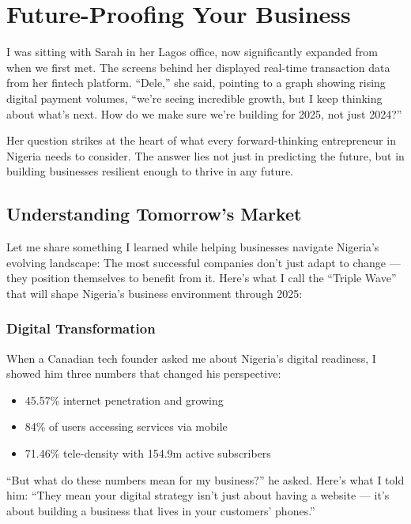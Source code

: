 \chapter{Future-Proofing Your Business}\label{ch:future-proofing-your-business}

I was sitting with Sarah in her Lagos office, now significantly expanded from when we first met. The screens behind her displayed real-time transaction data from her fintech platform. ``Dele,'' she said, pointing to a graph showing rising digital payment volumes, ``we're seeing incredible growth, but I keep thinking about what's next. How do we make sure we're building for 2025, not just 2024?''

Her question strikes at the heart of what every forward-thinking entrepreneur in Nigeria needs to consider. The answer lies not just in predicting the future, but in building businesses resilient enough to thrive in any future.

\section{Understanding Tomorrow's Market}\label{sec:understanding-tomorrow}

Let me share something I learned while helping businesses navigate Nigeria's evolving landscape: The most successful companies don't just adapt to change --- they position themselves to benefit from it. Here's what I call the ``Triple Wave'' that will shape Nigeria's business environment through 2025:

\subsection{Digital Transformation}\label{subsec:digital-transformation}

When a Canadian tech founder asked me about Nigeria's digital readiness, I showed him three numbers that changed his perspective:
\begin{itemize}
    \item 45.57\% internet penetration and growing
    \item 84\% of users accessing services via mobile
    \item 71.46\% tele-density with 154.9m active subscribers
\end{itemize}

``But what do these numbers mean for my business?'' he asked. Here's what I told him: ``They mean your digital strategy isn't just about having a website --- it's about building a business that lives in your customers' phones.''

